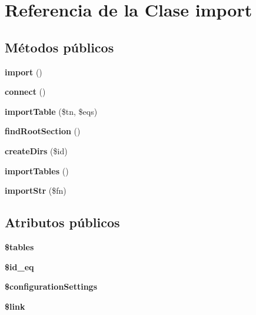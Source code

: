 \hypertarget{classimport}{}\section{Referencia de la Clase import}
\label{classimport}
\subsection*{Métodos públicos}
\begin{DoxyCompactItemize}
\item 
\mbox{\label{classimport_a2c5438f4bf08ebd69e0675cb56f8f04e}} 
{\bfseries import} ()
\item 
\mbox{\label{classimport_a981c9e22a3d8c43548a62af334841e4a}} 
{\bfseries connect} ()
\item 
\mbox{\label{classimport_ae689e36a8b4bc859a2bdf953af65d9a4}} 
{\bfseries import\+Table} (\$tn, \$eqs)
\item 
\mbox{\label{classimport_a79aec3c65f5939766d8bdf59de9037c7}} 
{\bfseries find\+Root\+Section} ()
\item 
\mbox{\label{classimport_a4120da704a0f2ba63380c86bf5da00da}} 
{\bfseries create\+Dirs} (\$id)
\item 
\mbox{\label{classimport_abf37e24a7103afa8b9aa3e2ebde97d37}} 
{\bfseries import\+Tables} ()
\item 
\mbox{\label{classimport_aee27bb889c83b03228c6c4337cdcf5de}} 
{\bfseries import\+Str} (\$fn)
\end{DoxyCompactItemize}
\subsection*{Atributos públicos}
\begin{DoxyCompactItemize}
\item 
\mbox{\label{classimport_a44e9f11d7a5e167bd09b09d8fe090b1e}} 
{\bfseries \$tables}
\item 
\mbox{\label{classimport_a508b999d03da21afcbbe2f4a0f28a292}} 
{\bfseries \$id\+\_\+eq}
\item 
\mbox{\label{classimport_a23438816c4c0d0e6aa3cd83f6224c8f1}} 
{\bfseries \$configuration\+Settings}
\item 
\mbox{\label{classimport_aa35f12e2cf3b02dac15d9c5f95902584}} 
{\bfseries \$link}
\end{DoxyCompactItemize}


